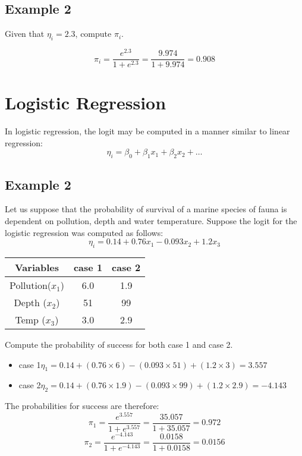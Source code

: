 \documentclass[]{report}
\begin{document}
\subsection{Example 2}
Given that $\eta_i = 2.3$, compute $\pi_i$.

\[ \pi_i  =  \frac{e^{2.3}}{1 + e^{2.3}} = \frac{9.974}{1 + 9.974} = 0.908 \]

\section{Logistic Regression}
In logistic regression, the logit may be computed in a manner similar to linear regression:
\[ \eta_i = \beta_0 + \beta_1x_1 + \beta_2x_2 + \ldots  \]

\subsection{Example 2}
Let us suppose that the probability of survival of a marine species of fauna is dependent on pollution, depth and water temperature. Suppose the logit for the logistic regression was computed as follows:
\[ \eta_i = 0.14 + 0.76x_1 - 0.093x_2 + 1.2x_3  \]
\begin{center}
\begin{tabular}{|c|c|c|}
  \hline
Variables & case 1 & case 2 \\ \hline
Pollution($x_1$) & 6.0 & 1.9 \\
Depth ($x_2$)& 51 & 99 \\
Temp ($x_3$) & 3.0 & 2.9 \\
  \hline
\end{tabular}
\end{center}
Compute the probability of success for both case 1 and case 2.

\begin{itemize}
\item case 1$ \eta_1 = 0.14 + (0.76 \times 6)	- (0.093\times 51) + (1.2\times 3) = 3.557$
\item case 2$ \eta_2 = 0.14 + (0.76 \times 1.9)	- (0.093\times 99) + (1.2\times 2.9) = -4.143$
\end{itemize}

The probabilities for success are therefore:
\[ \pi_1  =  \frac{e^{3.557}}{1 + e^{3.557}} = \frac{35.057}{1 + 35.057} = 0.972 \]
\[ \pi_2  =  \frac{e^{-4.143}}{1 + e^{-4.143}} = \frac{0.0158}{1 + 0.0158} = 0.0156 \]
\end{document}

